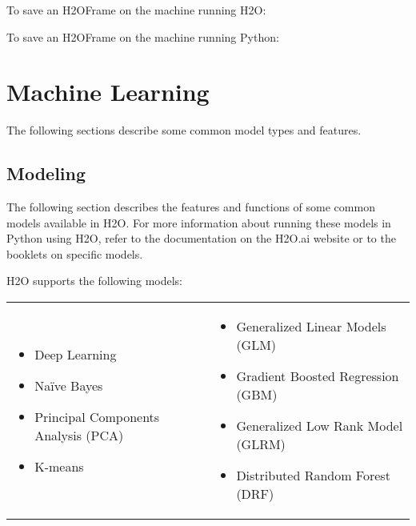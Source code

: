 {To save an H2OFrame on the machine running H2O:


To save an H2OFrame on the machine running Python:


\section{Machine Learning}

The following sections describe some common model types and features. 

\subsection{Modeling}
The following section describes the features and functions of some common models available in H2O.  For more information about running these models in Python using H2O, refer to the documentation on
the H2O.ai website or to the booklets on specific models.


H2O supports the following models:  

\begin{frame}%

\begin{tabular}{p{5.0cm}p{6.0cm}}

\begin{itemize}
  \item Deep Learning
  \item Na\"{i}ve Bayes
  \item Principal Components Analysis (PCA)
  \item K-means
\end{itemize} &

\begin{itemize}
  \item Generalized Linear Models (GLM) 
  \item Gradient Boosted Regression (GBM)
  \item Generalized Low Rank Model (GLRM)
  \item Distributed Random Forest (DRF)
\end{itemize}

\end{tabular}

\end{frame}

}
